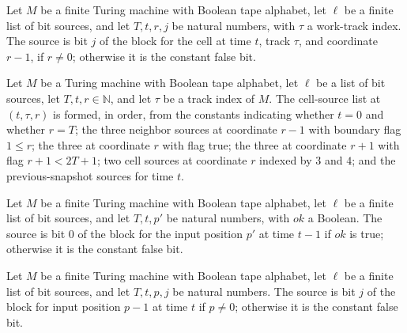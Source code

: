\begin{definition}
\label{Complexity.chSrc}
\leanok
{}
Let $M$ be a finite Turing machine with Boolean tape alphabet, let $\ell$ be a finite
list of bit sources, and let $T,t,r,j$ be natural numbers, with $\tau$ a work-track
index. The source is bit $j$ of the block for the cell at time $t$, track $\tau$, and
coordinate $r-1$, if $r\ne0$; otherwise it is the constant false bit.
\end{definition}

\begin{definition}
\label{Complexity.cellSrcs}
\leanok
{}
Let $M$ be a Turing machine with Boolean tape alphabet, let $\ell$ be a list of bit
sources, let $T,t,r\in\mathbb{N}$, and let $\tau$ be a track index of $M$. The
cell-source list at $(t,\tau,r)$ is formed, in order, from the constants indicating
whether $t=0$ and whether $r=T$; the three neighbor sources at coordinate $r-1$ with
boundary flag $1\le r$; the three at coordinate $r$ with flag true; the three at
coordinate $r+1$ with flag $r+1<2T+1$; two cell sources at coordinate $r$ indexed by $3$
and $4$; and the previous-snapshot sources for time $t$.
\end{definition}

\begin{definition}
\label{Complexity.ihSrc}
\leanok
{}
Let $M$ be a finite Turing machine with Boolean tape alphabet, let $\ell$ be a finite
list of bit sources, and let $T,t,p'$ be natural numbers, with $ok$ a Boolean. The
source is bit $0$ of the block for the input position $p'$ at time $t-1$ if $ok$ is
true; otherwise it is the constant false bit.
\end{definition}

\begin{definition}
\label{Complexity.ichSrc}
\leanok
{}
Let $M$ be a finite Turing machine with Boolean tape alphabet, let $\ell$ be a finite
list of bit sources, and let $T,t,p,j$ be natural numbers. The source is bit $j$ of the
block for input position $p-1$ at time $t$ if $p\ne0$; otherwise it is the constant
false bit.
\end{definition}

